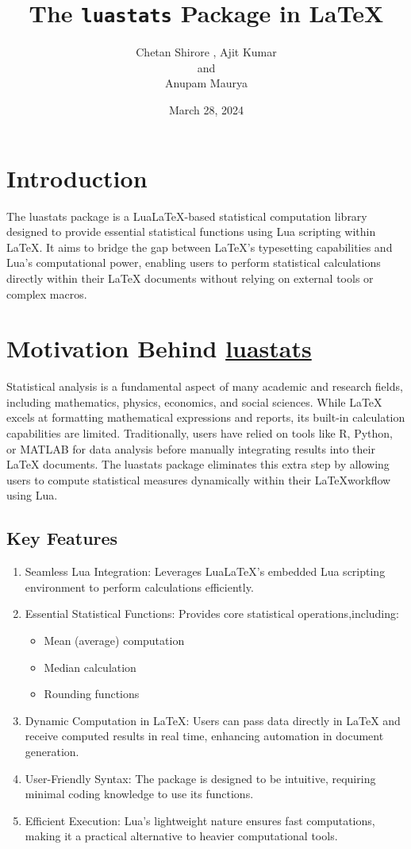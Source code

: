 \documentclass{article}
\title{The \texttt{luastats} Package in LaTeX}
\author{Chetan Shirore , Ajit Kumar\\ and\\ Anupam Maurya}
\date{March 28, 2024}
\begin{document}
	
	\maketitle
	
	\section{Introduction}
	
	The luastats package is a LuaLaTeX-based statistical computation library designed to provide essential statistical functions using Lua scripting within LaTeX. It aims to bridge the gap between LaTeX's typesetting capabilities and Lua's computational power, enabling users to perform statistical calculations directly within their LaTeX documents without relying on external tools or complex macros.
	
	\section{Motivation Behind \underline{luastats}}
	
	Statistical analysis is a fundamental aspect of many academic and research fields, including mathematics, physics, economics, and social sciences. While LaTeX excels at formatting mathematical expressions and reports, its built-in calculation capabilities are limited. Traditionally, users have relied on tools like R, Python, or MATLAB for data analysis before manually integrating results into their LaTeX documents. The luastats package eliminates this extra step by allowing users to compute statistical measures dynamically within their \LaTeX \;workflow using Lua.
	
	\subsection{Key Features}
	\begin{enumerate}
		\item Seamless Lua Integration: Leverages LuaLaTeX's embedded Lua scripting environment to perform calculations efficiently.
		\item Essential Statistical Functions: Provides core statistical operations,including:
		\begin{itemize}
			\item Mean (average) computation
			\item Median calculation
			\item Rounding functions
		\end{itemize}
		\item Dynamic Computation in LaTeX: Users can pass data directly in LaTeX and receive computed results in real time, enhancing automation in document generation.
		\item User-Friendly Syntax: The package is designed to be intuitive, requiring minimal coding knowledge to use its functions.
		\item Efficient Execution: Lua's lightweight nature ensures fast computations, making it a practical alternative to heavier computational tools.
	\end{enumerate}
	
\end{document}
